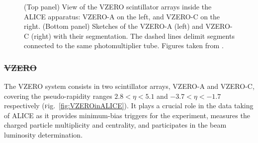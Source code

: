 \documentclass[ALICE,manyauthors]{cernphprep}
\newcommand{\Fig}       {\textsc{f}ig.~}
\newcommand{\fig}       {\Fig}
\providecommand{\DIFaddtex}[1]{{\protect\color{blue}\uwave{#1}}} %
\providecommand{\DIFdeltex}[1]{{\protect\color{red}\sout{#1}}}                      %
\providecommand{\DIFdelbegin}{} %
\providecommand{\DIFdelend}{} %
\providecommand{\DIFaddendFL}{} %
\providecommand{\DIFadd}[1]{\texorpdfstring{\DIFaddtex{#1}}{#1}} %
\providecommand{\DIFdel}[1]{\texorpdfstring{\DIFdeltex{#1}}{}} %
\newcommand{\DIFscaledelfig}{0.5}
\newlength{\DIFdelgraphicswidth} %
\newlength{\DIFdelgraphicsheight} %
\newcommand{\DIFdelincludegraphics}[2][]{%
\sbox{\DIFdelgraphicsbox}{\DIFOincludegraphics[#1]{#2}}%
\settoboxwidth{\DIFdelgraphicswidth}{\DIFdelgraphicsbox} %
\settoboxtotalheight{\DIFdelgraphicsheight}{\DIFdelgraphicsbox} %
\scalebox{\DIFscaledelfig}{%
\parbox[b]{\DIFdelgraphicswidth}{\usebox{\DIFdelgraphicsbox}\\[-\baselineskip] \rule{\DIFdelgraphicswidth}{0em}}\llap{\resizebox{\DIFdelgraphicswidth}{\DIFdelgraphicsheight}{%
\setlength{\unitlength}{\DIFdelgraphicswidth}%
\begin{picture}(1,1)%
\thicklines\linethickness{2pt} %
{\color[rgb]{1,0,0}\put(0,0){\framebox(1,1){}}}%
{\color[rgb]{1,0,0}\put(0,0){\line( 1,1){1}}}%
{\color[rgb]{1,0,0}\put(0,1){\line(1,-1){1}}}%
\end{picture}%
}\hspace*{3pt}}} %
} %
\DeclareRobustCommand{\DIFdelbegin}{\DIFOdelbegin \let\includegraphics\DIFdelincludegraphics} %
\DeclareRobustCommand{\DIFdelend}{\DIFOaddend \let\includegraphics\DIFOincludegraphics} %
\DeclareRobustCommand{\DIFaddendFL}{\DIFOaddendFL \let\includegraphics\DIFOincludegraphics} %
\begin{document}
\subsubsection{\DIFadd{VZERO}}
\label{subsubsec:VZERO}

\begin{figure}[t]
\DIFaddendFL \centering
{}	
	\caption{(Top panel) View of the VZERO scintillator arrays inside the ALICE apparatus: VZERO-A on the left, and VZERO-C on the right. (Bottom panel) Sketches of the VZERO-A (left) and VZERO-C (right) with their segmentation. The dashed lines delimit segments connected to the same photomultiplier tube. Figures taken from \cite{alicecollaborationALICEExperimentJourney2022}\cite{alicecollaborationPerformanceALICEVZERO2013}.}
	\label{fig:VZEROdetector}
\end{figure}

\DIFdelbegin \subsubsection{\DIFdel{VZERO}}
\addtocounter{subsubsection}{-1}%

\DIFdelend The VZERO system consists in two scintillator arrays, VZERO-A and VZERO-C, covering the pseudo-rapidity ranges $2.8 < \eta < 5.1$ and $-3.7 < \eta < -1.7$ respectively (\fig\ref{fig:VZEROinALICE}). It plays a crucial role in the data taking of ALICE as it provides minimum-bias triggers for the experiment, measures the charged particle multiplicity and centrality, and participates in the beam luminosity determination.
\end{document}
